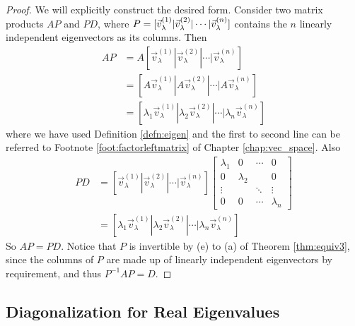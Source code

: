 \begin{proof}
We will explicitly construct the desired form. Consider two matrix products $AP$ and $PD$, where $P = [\smash{\vec{v}_\lambda^{(1)}}|\smash{\vec{v}_\lambda^{(2)}}|\cdots|\smash{\vec{v}_\lambda^{(n)}}]$ contains the $n$ linearly independent eigenvectors as its columns. Then
\begin{align*}
AP &= A[\vec{v}_\lambda^{(1)}|\vec{v}_\lambda^{(2)}|\cdots|\vec{v}_\lambda^{(n)}] \\
&= [A\vec{v}_\lambda^{(1)}|A\vec{v}_\lambda^{(2)}|\cdots|A\vec{v}_\lambda^{(n)}] \\
&= [\lambda_1\vec{v}_\lambda^{(1)}|\lambda_2\vec{v}_\lambda^{(2)}|\cdots|\lambda_n \vec{v}_\lambda^{(n)}]
\end{align*}
where we have used Definition \ref{defn:eigen} and the first to second line can be referred to Footnote \ref{foot:factorleftmatrix} of Chapter \ref{chap:vec_space}. Also
\begin{align*}
PD &= [\vec{v}_\lambda^{(1)}|\vec{v}_\lambda^{(2)}|\cdots|\vec{v}_\lambda^{(n)}]
\begin{bmatrix}
\lambda_1 & 0 & \cdots & 0 \\
0 & \lambda_2 & & 0 \\
\vdots & & \ddots & \vdots \\
0 & 0 & \cdots & \lambda_n
\end{bmatrix} \\
&= [\lambda_1\vec{v}_\lambda^{(1)}|\lambda_2\vec{v}_\lambda^{(2)}|\cdots|\lambda_n \vec{v}_\lambda^{(n)}]
\end{align*}
So $AP = PD$. Notice that $P$ is invertible by (e) to (a) of Theorem \ref{thm:equiv3}, since the columns of $P$ are made up of linearly independent eigenvectors by requirement, and thus $P^{-1}AP = D$.
\end{proof}

\subsection{Diagonalization for Real Eigenvalues}
\label{section:realeigen}

